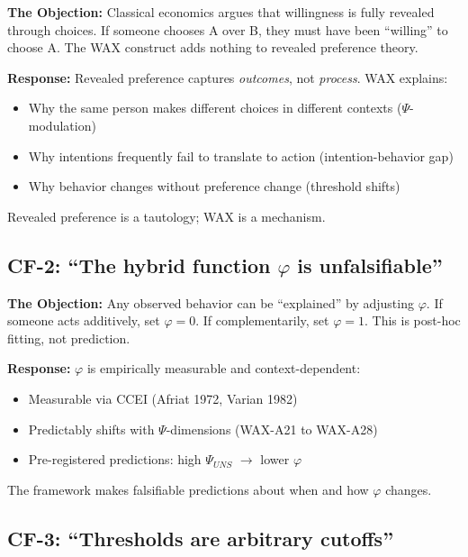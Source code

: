 \textbf{The Objection:} Classical economics argues that willingness is fully revealed through choices. If someone chooses A over B, they must have been ``willing'' to choose A. The WAX construct adds nothing to revealed preference theory.

\textbf{Response:} Revealed preference captures \textit{outcomes}, not \textit{process}. WAX explains:
\begin{itemize}[nosep]
    \item Why the same person makes different choices in different contexts ($\Psi$-modulation)
    \item Why intentions frequently fail to translate to action (intention-behavior gap)
    \item Why behavior changes without preference change (threshold shifts)
\end{itemize}
Revealed preference is a tautology; WAX is a mechanism.

\subsection{CF-2: ``The hybrid function $\varphi$ is unfalsifiable''}

\textbf{The Objection:} Any observed behavior can be ``explained'' by adjusting $\varphi$. If someone acts additively, set $\varphi = 0$. If complementarily, set $\varphi = 1$. This is post-hoc fitting, not prediction.

\textbf{Response:} $\varphi$ is empirically measurable and context-dependent:
\begin{itemize}[nosep]
    \item Measurable via CCEI (Afriat 1972, Varian 1982)
    \item Predictably shifts with $\Psi$-dimensions (WAX-A21 to WAX-A28)
    \item Pre-registered predictions: high $\Psi_{UNS}$ $\to$ lower $\varphi$
\end{itemize}
The framework makes falsifiable predictions about when and how $\varphi$ changes.

\subsection{CF-3: ``Thresholds are arbitrary cutoffs''}

